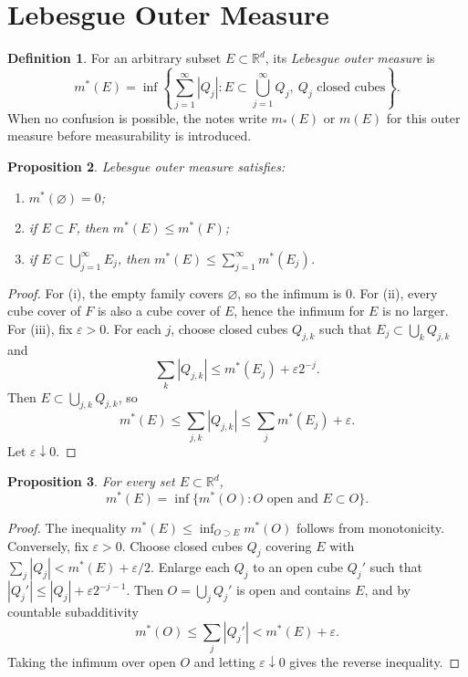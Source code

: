 \documentclass[11pt,openany]{book}
\numberwithin{equation}{chapter}
\theoremstyle{definition}
\newtheorem{definition}{Definition}[chapter]
\theoremstyle{plain}
\newtheorem{proposition}[definition]{Proposition}
\theoremstyle{remark}
\newcommand{\R}{\mathbb{R}}
\newcommand{\eps}{\varepsilon}
\newcommand{\1}{\mathbf{1}}
\newcommand{\abs}[1]{\left\lvert #1\right\rvert}
\begin{document}
\section{Lebesgue Outer Measure}

\begin{definition}
For an arbitrary subset \(E\subset\R^d\), its \emph{Lebesgue outer measure} is
\[
    m^*(E)=\inf\left\{\sum_{j=1}^\infty \abs{Q_j}: E\subset \bigcup_{j=1}^\infty Q_j,\ Q_j\text{ closed cubes}\right\}.
\]
When no confusion is possible, the notes write \(m_*(E)\) or \(m(E)\) for this outer measure before measurability is introduced.
\end{definition}

\begin{proposition}
Lebesgue outer measure satisfies:
\begin{enumerate}[label=(\roman*)]
    \item \(m^*(\varnothing)=0\);
    \item if \(E\subset F\), then \(m^*(E)\le m^*(F)\);
    \item if \(E\subset\bigcup_{j=1}^\infty E_j\), then \(m^*(E)\le\sum_{j=1}^\infty m^*(E_j)\).
\end{enumerate}
\end{proposition}

\begin{proof}
For (i), the empty family covers \(\varnothing\), so the infimum is \(0\).  For (ii), every cube cover of \(F\) is also a cube cover of \(E\), hence the infimum for \(E\) is no larger.  For (iii), fix \(\eps>0\).  For each \(j\), choose closed cubes \(Q_{j,k}\) such that \(E_j\subset\bigcup_k Q_{j,k}\) and
\[
    \sum_k\abs{Q_{j,k}}\le m^*(E_j)+\eps 2^{-j}.
\]
Then \(E\subset\bigcup_{j,k}Q_{j,k}\), so
\[
    m^*(E)
    \le \sum_{j,k}\abs{Q_{j,k}}
    \le \sum_j m^*(E_j)+\eps.
\]
Let \(\eps\downarrow0\).
\end{proof}

\begin{proposition}
For every set \(E\subset\R^d\),
\[
    m^*(E)=\inf\{m^*(O): O\text{ open and }E\subset O\}.
\]
\end{proposition}

\begin{proof}
The inequality \(m^*(E)\le \inf_{O\supset E}m^*(O)\) follows from monotonicity.  Conversely, fix \(\eps>0\).  Choose closed cubes \(Q_j\) covering \(E\) with \(\sum_j\abs{Q_j}<m^*(E)+\eps/2\).  Enlarge each \(Q_j\) to an open cube \(Q_j'\) such that \(\abs{Q_j'}\le \abs{Q_j}+\eps 2^{-j-1}\).  Then \(O=\bigcup_j Q_j'\) is open and contains \(E\), and by countable subadditivity
\[
    m^*(O)\le\sum_j\abs{Q_j'}<m^*(E)+\eps.
\]
Taking the infimum over open \(O\) and letting \(\eps\downarrow0\) gives the reverse inequality.
\end{proof}
\end{document}
